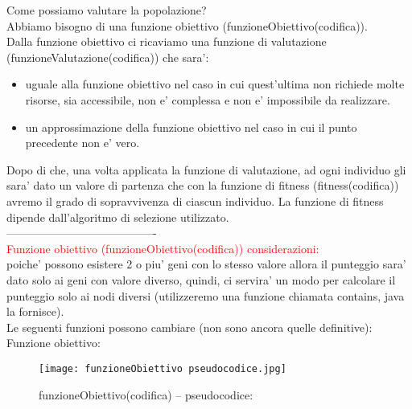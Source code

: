 \documentclass[10pt,a4paper]{article}
\begin{document}
      Come possiamo valutare la popolazione?\\
      Abbiamo bisogno di una funzione obiettivo (funzioneObiettivo(codifica)).\\
      Dalla funzione obiettivo ci ricaviamo una funzione di valutazione (funzioneValutazione(codifica)) che sara':
      \begin{itemize}
        \item uguale alla funzione obiettivo nel caso in cui quest'ultima non richiede molte risorse, 
        sia accessibile, non e' complessa e non e' impossibile da realizzare.
        \item un approssimazione della funzione obiettivo nel caso in cui il punto precedente non e' 
        vero. 
      \end{itemize}
      Dopo di che, una volta applicata la funzione di valutazione, ad ogni individuo gli sara' dato un valore di 
      partenza che con la funzione di fitness (fitness(codifica)) avremo il grado di sopravvivenza di ciascun 
      individuo. La funzione di fitness dipende dall'algoritmo di selezione utilizzato.\\
      ----------------------------------------
      \\
      \textcolor{red}{Funzione obiettivo (funzioneObiettivo(codifica)) considerazioni:}\\
      poiche' possono esistere 2 o piu' geni con lo stesso valore allora il punteggio sara' dato solo ai 
      geni con valore diverso, quindi, ci servira' un modo per calcolare il punteggio solo ai nodi 
      diversi (utilizzeremo una funzione chiamata contains, java la fornisce).\\
      Le seguenti funzioni possono cambiare (non sono ancora quelle definitive):\\
      Funzione obiettivo:\\
      \begin{figure}[h!]
        \centering
        \caption{funzioneObiettivo(codifica) -- pseudocodice:}
        \texttt{[image: funzioneObiettivo pseudocodice.jpg]}
        \label{funzioneObiettivoPseudocodice}
      \end{figure}
      \\\\\\\\\\\\\\\\\\\\\\\\\\\\\\\\\\\\\\\\\\\\\\\\\\\\
      
\end{document}

